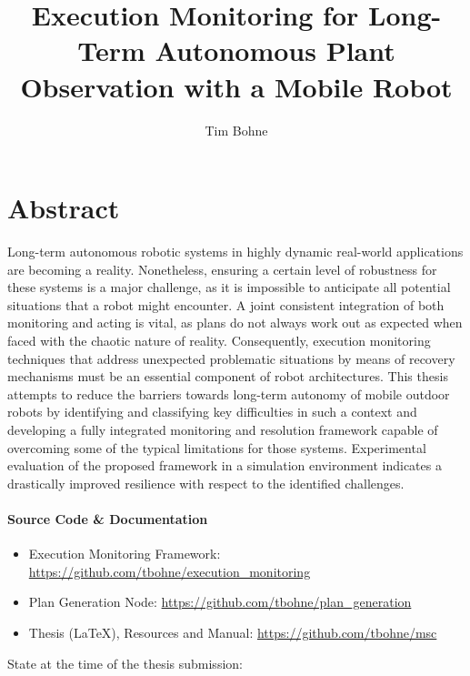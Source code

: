 \documentclass[english, master, utf8]{base/thesis_KBS}
\newcommand{\code}{\collectverb{\codebox}}
\begin{document}
\setcounter{secnumdepth}{3}

\title{Execution Monitoring for Long-Term Autonomous Plant Observation with a Mobile Robot}
\author{Tim Bohne}

\generatetitle

\cleardoublepage

\chapter*{\hfill Abstract}
\begin{prefacesection}
\noindent
Long-term autonomous robotic systems in highly dynamic real-world applications are becoming a reality.
Nonetheless, ensuring a certain level of robustness for these systems is a major challenge, as it is
impossible to anticipate all potential situations that a robot might encounter. A joint consistent
integration of both monitoring and acting is vital, as plans do not always work out as expected when
faced with the chaotic nature of reality. Consequently, execution monitoring techniques that address
unexpected problematic situations by means of recovery mechanisms must be an essential component of
robot architectures. This thesis attempts to reduce the barriers towards long-term autonomy of mobile
outdoor robots by identifying and classifying key difficulties in such a context and developing a fully
integrated monitoring and resolution framework capable of overcoming some of the typical limitations for
those systems. Experimental evaluation of the proposed framework in a simulation environment indicates a
drastically improved resilience with respect to the identified challenges.

\vfill

\subsubsection*{Source Code \& Documentation}
\begin{itemize}
  \item Execution Monitoring Framework: \textcolor{link-color}{\url{https://github.com/tbohne/execution_monitoring}}
  \item Plan Generation Node: \textcolor{link-color}{\url{https://github.com/tbohne/plan_generation}}
  \item Thesis (\LaTeX{}), Resources and Manual: \textcolor{link-color}{\url{https://github.com/tbohne/msc}}
\end{itemize}
{\footnotesize State at the time of the thesis submission: \code{git tag v1.0}}

\end{prefacesection}
\end{document}
